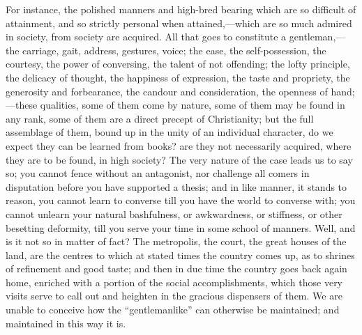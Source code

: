 For instance, the polished manners and high-bred bearing which are
so difficult of attainment, and so strictly personal when
attained,—which are so much admired in society, from society are
acquired. All that goes to constitute a gentleman,—the carriage,
gait, address, gestures, voice; the ease, the self-possession, the
courtesy, the power of conversing, the talent of not offending; the
lofty principle, the delicacy of thought, the happiness of expression,
the taste and propriety, the generosity and forbearance, the candour
and consideration, the openness of hand;—these qualities, some of
them come by nature, some of them may be found in any rank, some of
them are a direct precept of Christianity; but the full assemblage of
them, bound up in the unity of an individual character, do we expect
they can be learned from books? are they not necessarily acquired,
where they are to be found, in high society? The very nature of the
case leads us to say so; you cannot fence without an antagonist, nor
challenge all comers in disputation before you have supported a
thesis; and in like manner, it stands to reason, you cannot learn to
converse till you have the world to converse with; you cannot unlearn
your natural bashfulness, or awkwardness, or stiffness, or other
besetting deformity, till you serve your time in some school of
manners. Well, and is it not so in matter of fact? The metropolis, the
court, the great houses of the land, are the centres to which at
stated times the country comes up, as to shrines of refinement and
good taste; and then in due time the country goes back again home,
enriched with a portion of the social accomplishments, which those
very visits serve to call out and heighten in the gracious dispensers
of them. We are unable to conceive how the ``gentlemanlike''
can otherwise be maintained; and maintained in this way it is.

